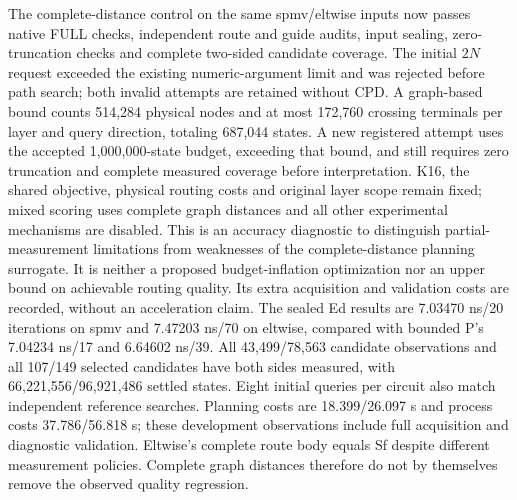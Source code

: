 \documentclass[conference,10pt]{IEEEtran}
\begin{document}
The complete-distance control on the same spmv/eltwise inputs now passes native FULL checks, independent route and guide audits, input sealing, zero-truncation checks and complete two-sided candidate coverage. The initial $2N$ request exceeded the existing numeric-argument limit and was rejected before path search; both invalid attempts are retained without CPD. A graph-based bound counts 514,284 physical nodes and at most 172,760 crossing terminals per layer and query direction, totaling 687,044 states. A new registered attempt uses the accepted 1,000,000-state budget, exceeding that bound, and still requires zero truncation and complete measured coverage before interpretation. K16, the shared objective, physical routing costs and original layer scope remain fixed; mixed scoring uses complete graph distances and all other experimental mechanisms are disabled. This is an accuracy diagnostic to distinguish partial-measurement limitations from weaknesses of the complete-distance planning surrogate. It is neither a proposed budget-inflation optimization nor an upper bound on achievable routing quality. Its extra acquisition and validation costs are recorded, without an acceleration claim.
The sealed Ed results are 7.03470 ns/20 iterations on spmv and 7.47203 ns/70 on eltwise, compared with bounded P's 7.04234 ns/17 and 6.64602 ns/39. All 43,499/78,563 candidate observations and all 107/149 selected candidates have both sides measured, with 66,221,556/96,921,486 settled states. Eight initial queries per circuit also match independent reference searches. Planning costs are 18.399/26.097 s and process costs 37.786/56.818 s; these development observations include full acquisition and diagnostic validation. Eltwise's complete route body equals Sf despite different measurement policies. Complete graph distances therefore do not by themselves remove the observed quality regression.
\end{document}
